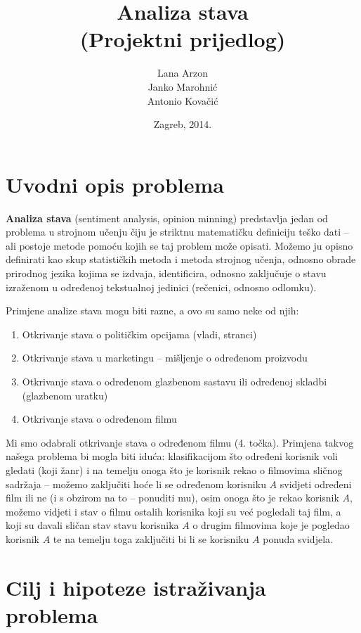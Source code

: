 \documentclass[12pt,a4paper,titlepage]{article}
\title{Analiza stava\\(Projektni prijedlog)}
\author{Lana Arzon\\Janko Marohnić\\Antonio Kovačić}
\date{Zagreb, 2014.}
\begin{document}
\maketitle

\tableofcontents

\newpage

\section{Uvodni opis problema}

\textbf{Analiza stava} (sentiment analysis, opinion minning) predstavlja jedan od problema u strojnom učenju čiju je striktnu matematičku definiciju teško dati -- ali postoje metode pomoću kojih se taj problem može opisati. Možemo ju opisno definirati kao skup statističkih metoda i metoda strojnog učenja, odnosno obrade prirodnog jezika kojima se izdvaja, identificira, odnosno zaključuje o stavu izraženom u određenoj tekstualnoj jedinici (rečenici, odnosno odlomku).

Primjene analize stava mogu biti razne, a ovo su samo neke od njih:

\begin{enumerate}
  \item Otkrivanje stava o političkim opcijama (vladi, stranci)
  \item Otkrivanje stava u marketingu -- mišljenje o određenom proizvodu
  \item Otkrivanje stava o određenom glazbenom sastavu ili određenoj skladbi (glazbenom uratku)
  \item Otkrivanje stava o određenom filmu
\end{enumerate}

Mi smo odabrali otkrivanje stava o određenom filmu (4. točka). Primjena takvog našega problema bi mogla biti iduća: klasifikacijom što određeni korisnik voli gledati (koji žanr) i na temelju onoga što je korisnik rekao o filmovima sličnog sadržaja -- možemo zaključiti hoće li se određenom korisniku $A$ svidjeti određeni film ili ne (i s obzirom na to -- ponuditi mu), osim onoga što je rekao korisnik $A$, možemo vidjeti i stav o filmu ostalih korisnika koji su već pogledali taj film, a koji su davali sličan stav stavu korisnika $A$ o drugim filmovima koje je pogledao korisnik $A$ te na temelju toga zaključiti bi li se korisniku $A$ ponuda svidjela.

\section{Cilj i hipoteze istraživanja problema}
\end{document}
